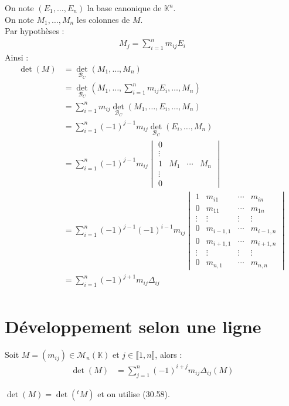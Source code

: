 \documentclass[../main.tex]{subfiles}
\begin{document}
\noindent On note $(E_1, \ldots, E_n)$ la base canonique de $\mathbb{K}^n$. \\
On note $M_1, \ldots, M_n$ les colonnes de $M$. \\
Par hypothèses : 
\begin{align*}
    M_j = \sum_{i=1}^{n} m_{ij} E_i
\end{align*}
Ainsi : 
\begin{align*}
    \operatorname{det}(M) &= \operatorname{det}_{\mathcal{B}_C}(M_1, \ldots, M_n) \\
    &= \operatorname{det}_{\mathcal{B}_C} \left( M_1, \ldots, \sum_{i=1}^{n} m_{ij} E_i, \ldots, M_n \right) \\
    &= \sum_{i=1}^{n} m_{ij} \operatorname{det}_{\mathcal{B}_C}(M_1, \ldots, E_i, \ldots, M_n) \\
    &= \sum_{i=1}^{n} (-1)^{j-1} m_{ij} \operatorname{det}_{\mathcal{B}_C}(E_i, \ldots, M_n) \\
    &= \sum_{i=1}^{n} (-1)^{j-1}m_{ij} \begin{vmatrix}
        0 & & & \\
        \vdots & & & \\
        1 & M_1 & \cdots & M_{n} \\
        \vdots & & & \\
        0 & & &
    \end{vmatrix} \\
    &= \sum_{i=1}^{n} (-1)^{j-1} (-1)^{i-1} m_{ij} \begin{vmatrix}
        1 & m_{i1} & \cdots & m_{in} \\
        0 & m_{11} & \cdots & m_{1n} \\
        \vdots & \vdots & \vdots & \vdots \\
        0 & m_{i-1, 1} & \cdots & m_{i-1, n} \\
        0 & m_{i+1, 1} & \cdots & m_{i+1, n} \\
        \vdots & \vdots & \vdots & \vdots \\
        0 & m_{n, 1} & \cdots & m_{n, n}
    \end{vmatrix} \\
    &= \sum_{i=1}^{n} (-1)^{j+1} m_{ij} \Delta_{ij} \\
\end{align*}

\section{Développement selon une ligne}
\begin{tcolorbox}[title=Théorème 30.59, title filled=false, colframe=orange, colback=orange!10!white]
    Soit $M = (m_{ij})\in \mathcal{M}_n(\mathbb{K})$ et $j\in \llbracket 1, n \rrbracket$, alors :
    \begin{align*}
        \operatorname{det}(M) &= \sum_{j=1}^{n} (-1)^{i+j} m_{ij} \Delta_{ij}(M)
    \end{align*}
\end{tcolorbox}

\noindent $\operatorname{det}(M) = \operatorname{det}(^tM)$ et on utilise (30.58). 
\end{document}
